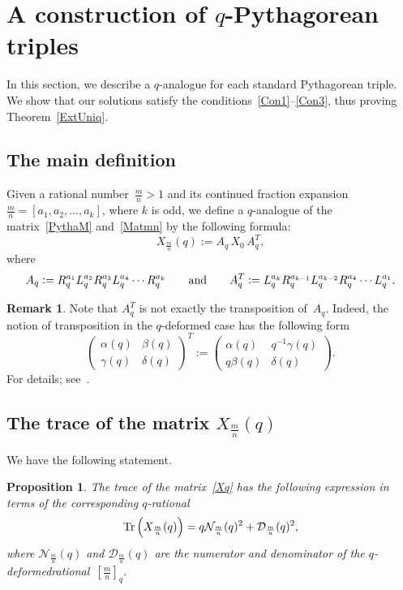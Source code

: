 \documentclass{article}[12pt]
\theoremstyle{plain}
\newtheorem{prop}[lem]{Proposition}
\theoremstyle{definition}
\newtheorem*{rem}{Remark}
\newcommand{\cD}{\mathcal{D}}
\newcommand{\cN}{\mathcal{N}}
\newcommand{\Tr}{\textup{Tr}}
\def\a{\alpha}
\def\b{\beta}
\def\d{\delta}
\def\g{\gamma}
\begin{document}
\section{A construction of $q$-Pythagorean triples}\label{SecTwo}

In this section, we describe a $q$-analogue for each
standard Pythagorean triple.
We show that our solutions satisfy the conditions~\ref{Con1}--\ref{Con3},
thus proving Theorem~\ref{ExtUniq}.


\subsection{The main definition}\label{DefSec}

Given a rational number~$\frac{m}{n}>1$ and its continued fraction
expansion $\frac{m}{n}=[a_1,a_2,\ldots,a_k]$, where $k$ is odd,
we define a $q$-analogue of the matrix~\eqref{PythaM} and~\eqref{Matmn}
by the following formula:
\begin{equation}
\label{Xq}
X_{\frac{m}{n}}(q):=
A_q\,X_0\,A_q^T,
\end{equation}
where 
$$
A_q:=R_q^{a_1}L_q^{a_2}R_q^{a_3}L_q^{a_4}\cdots{}R_q^{a_k}
\qquad\hbox{and}\qquad
A_q^T:=L_q^{a_k}R_q^{a_{k-1}}L_q^{a_{k-2}}R_q^{a_4}\cdots{}L_q^{a_1}.
$$

\begin{rem}
Note that $A_q^T$ is not exactly the transposition of~$A_q$.
Indeed, the notion of transposition in the $q$-deformed case has the following form
$$
\begin{pmatrix}
\a(q)&\b(q)\\[4pt]
\g(q)&\d(q)
\end{pmatrix}^T
:=\begin{pmatrix}
\a(q)&q^{-1}\g(q)\\[4pt]
q\b(q)&\d(q)
\end{pmatrix}.
$$
For details; see~\cite{XY}.
\end{rem}

\subsection{The trace of the matrix $X_{\frac{m}{n}}(q)$}\label{qEuclSec}

We have the following statement.

\begin{prop}
\label{TraceProp}
The trace of the matrix~\eqref{Xq} has the following expression in terms of the
corresponding $q$-rational
\begin{equation}
\label{TraceForm}
\Tr\left(X_{\frac{m}{n}}(q)\right)=
q\cN_{\frac{m}{n}}(q)^2+\cD_{\frac{m}{n}}(q)^2,
\end{equation}
where $\cN_{\frac{m}{n}}(q)$ and $\cD_{\frac{m}{n}}(q)$ are the numerator and denominator 
of the $q$-deformedrational~$\left[\frac{m}{n}\right]_q$.
\end{prop}
\end{document}
